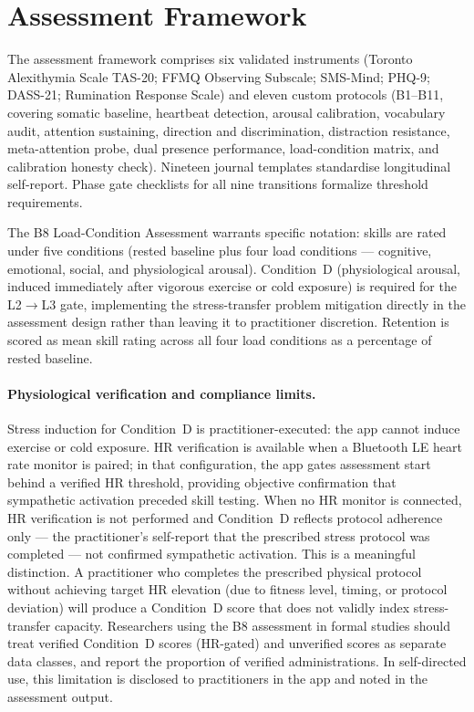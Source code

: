 \documentclass[12pt, a4paper]{article}
\begin{document}
\section{Assessment Framework}

The assessment framework comprises six validated instruments (Toronto Alexithymia
Scale TAS-20; FFMQ Observing Subscale; SMS-Mind; PHQ-9; DASS-21; Rumination Response
Scale) and eleven custom protocols (B1--B11, covering somatic baseline, heartbeat
detection, arousal calibration, vocabulary audit, attention sustaining, direction and
discrimination, distraction resistance, meta-attention probe, dual presence
performance, load-condition matrix, and calibration honesty check). Nineteen journal
templates standardise longitudinal self-report. Phase gate checklists for all nine
transitions formalize threshold requirements.

The B8 Load-Condition Assessment warrants specific notation: skills are rated under
five conditions (rested baseline plus four load conditions --- cognitive, emotional,
social, and physiological arousal). Condition~D (physiological arousal, induced
immediately after vigorous exercise or cold exposure) is required for the L2$\to$L3
gate, implementing the stress-transfer problem mitigation directly in the assessment
design rather than leaving it to practitioner discretion. Retention is scored as
mean skill rating across all four load conditions as a percentage of rested baseline.

\paragraph{Physiological verification and compliance limits.}
Stress induction for Condition~D is practitioner-executed: the app cannot induce
exercise or cold exposure. HR verification is available when a Bluetooth LE heart
rate monitor is paired; in that configuration, the app gates assessment start
behind a verified HR threshold, providing objective confirmation that sympathetic
activation preceded skill testing. When no HR monitor is connected, HR verification
is not performed and Condition~D reflects protocol adherence only --- the
practitioner's self-report that the prescribed stress protocol was completed ---
not confirmed sympathetic activation. This is a meaningful distinction.
A practitioner who completes the prescribed physical protocol without achieving
target HR elevation (due to fitness level, timing, or protocol deviation) will
produce a Condition~D score that does not validly index stress-transfer capacity.
Researchers using the B8 assessment in formal studies should treat verified
Condition~D scores (HR-gated) and unverified scores as separate data classes,
and report the proportion of verified administrations. In self-directed use,
this limitation is disclosed to practitioners in the app and noted in the
assessment output.
\end{document}

